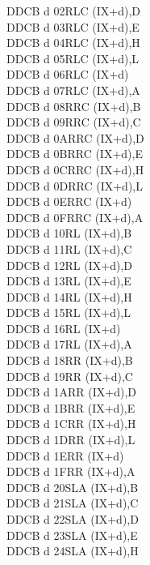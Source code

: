 \begin{multicols}{3}
{\begin{tabbing}
    DDCB d 02\>RLC (IX+d),D\UNDOC\\
    DDCB d 03\>RLC (IX+d),E\UNDOC\\
    DDCB d 04\>RLC (IX+d),H\UNDOC\\
    DDCB d 05\>RLC (IX+d),L\UNDOC\\
    DDCB d 06\>RLC (IX+d)\\
    DDCB d 07\>RLC (IX+d),A\UNDOC\\
    DDCB d 08\>RRC (IX+d),B\UNDOC\\
    DDCB d 09\>RRC (IX+d),C\UNDOC\\
    DDCB d 0A\>RRC (IX+d),D\UNDOC\\
    DDCB d 0B\>RRC (IX+d),E\UNDOC\\
    DDCB d 0C\>RRC (IX+d),H\UNDOC\\
    DDCB d 0D\>RRC (IX+d),L\UNDOC\\
    DDCB d 0E\>RRC (IX+d)\\
    DDCB d 0F\>RRC (IX+d),A\UNDOC\\
    DDCB d 10\>RL (IX+d),B\UNDOC\\
    DDCB d 11\>RL (IX+d),C\UNDOC\\
    DDCB d 12\>RL (IX+d),D\UNDOC\\
    DDCB d 13\>RL (IX+d),E\UNDOC\\
    DDCB d 14\>RL (IX+d),H\UNDOC\\
    DDCB d 15\>RL (IX+d),L\UNDOC\\
    DDCB d 16\>RL (IX+d)\\
    DDCB d 17\>RL (IX+d),A\UNDOC\\
    DDCB d 18\>RR (IX+d),B\UNDOC\\
    DDCB d 19\>RR (IX+d),C\UNDOC\\
    DDCB d 1A\>RR (IX+d),D\UNDOC\\
    DDCB d 1B\>RR (IX+d),E\UNDOC\\
    DDCB d 1C\>RR (IX+d),H\UNDOC\\
    DDCB d 1D\>RR (IX+d),L\UNDOC\\
    DDCB d 1E\>RR (IX+d)\\
    DDCB d 1F\>RR (IX+d),A\UNDOC\\
    DDCB d 20\>SLA (IX+d),B\UNDOC\\
    DDCB d 21\>SLA (IX+d),C\UNDOC\\
    DDCB d 22\>SLA (IX+d),D\UNDOC\\
    DDCB d 23\>SLA (IX+d),E\UNDOC\\
    DDCB d 24\>SLA (IX+d),H\UNDOC\\

\end{tabbing}}
\end{multicols}
